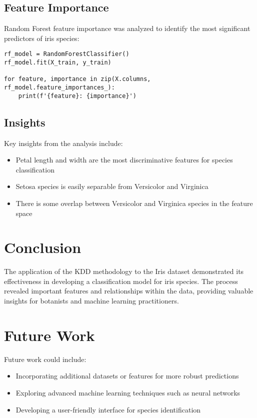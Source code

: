 \documentclass[12pt,a4paper]{article}
\begin{document}
\subsection{Feature Importance}
Random Forest feature importance was analyzed to identify the most significant predictors of iris species:

\begin{verbatim}
rf_model = RandomForestClassifier()
rf_model.fit(X_train, y_train)

for feature, importance in zip(X.columns, rf_model.feature_importances_):
    print(f'{feature}: {importance}')
\end{verbatim}

\subsection{Insights}
Key insights from the analysis include:
\begin{itemize}
    \item Petal length and width are the most discriminative features for species classification
    \item Setosa species is easily separable from Versicolor and Virginica
    \item There is some overlap between Versicolor and Virginica species in the feature space
\end{itemize}

\section{Conclusion}
The application of the KDD methodology to the Iris dataset demonstrated its effectiveness in developing a classification model for iris species. The process revealed important features and relationships within the data, providing valuable insights for botanists and machine learning practitioners.

\section{Future Work}
Future work could include:
\begin{itemize}
    \item Incorporating additional datasets or features for more robust predictions
    \item Exploring advanced machine learning techniques such as neural networks
    \item Developing a user-friendly interface for species identification
\end{itemize}



\end{document}
